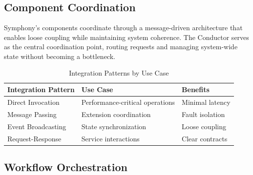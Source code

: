 
\subsection*{Component Coordination}

Symphony's components coordinate through a \textcolor{brandPrimary}{message-driven architecture} that enables loose coupling while maintaining system coherence. The Conductor serves as the central coordination point, routing requests and managing system-wide state without becoming a bottleneck.

\begin{table}[ht]
\centering
\begin{tabular}{@{}lll@{}}
\toprule
\textbf{Integration Pattern} & \textbf{Use Case} & \textbf{Benefits} \\
\midrule
Direct Invocation & Performance-critical operations & Minimal latency \\
Message Passing & Extension coordination & Fault isolation \\
Event Broadcasting & State synchronization & Loose coupling \\
Request-Response & Service interactions & Clear contracts \\
\bottomrule
\end{tabular}
\caption{Integration Patterns by Use Case}
\end{table}

\subsection*{Workflow Orchestration}

